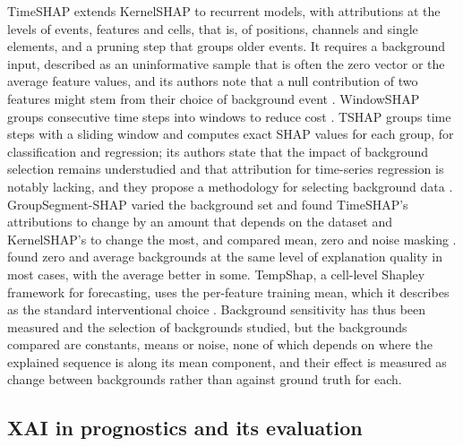 \documentclass{article}
\begin{document}
TimeSHAP extends KernelSHAP to recurrent models, with attributions at the levels of events, features and cells, that is, of positions, channels and single elements, and a pruning step that groups older events. It requires a background input, described as an uninformative sample that is often the zero vector or the average feature values, and its authors note that a null contribution of two features might stem from their choice of background event \citep{bento2021timeshap}. WindowSHAP groups consecutive time steps into windows to reduce cost \citep{nayebi2023windowshap}. TSHAP groups time steps with a sliding window and computes exact SHAP values for each group, for classification and regression; its authors state that the impact of background selection remains understudied and that attribution for time-series regression is notably lacking, and they propose a methodology for selecting background data \citep{nguyen2025tshap}.
GroupSegment-SHAP varied the background set and found TimeSHAP's attributions to change by an amount that depends on the dataset and KernelSHAP's to change the most, and compared mean, zero and noise masking \citep{kim2026groupsegment}. \citet{papadeas2026empirical} found zero and average backgrounds at the same level of explanation quality in most cases, with the average better in some. TempShap, a cell-level Shapley framework for forecasting, uses the per-feature training mean, which it describes as the standard interventional choice \citep{zhao2026tempshap}. Background sensitivity has thus been measured and the selection of backgrounds studied, but the backgrounds compared are constants, means or noise, none of which depends on where the explained sequence is along its mean component, and their effect is measured as change between backgrounds rather than against ground truth for each.

\subsection[XAI in prognostics and its evaluation]{XAI in prognostics and its evaluation}\label{sec:related:phm}
\end{document}
